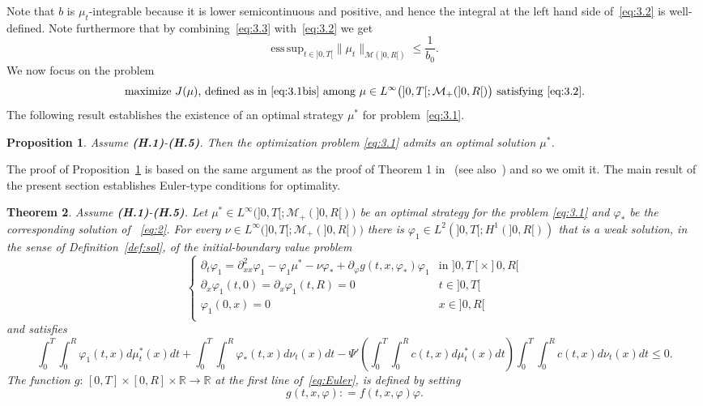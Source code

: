 \documentclass[11pt,leqno]{amsart}
\newtheorem{theorem}{Theorem}[section]
\newtheorem{proposition}[theorem]{Proposition}
\numberwithin{equation}{section}
\begin{document}
Note that $b$ is $\mu_t$-integrable because it is lower semicontinuous and positive, and hence the integral at the left hand side of~\eqref{eq:3.2} is well-defined. 
Note furthermore that by combining~\eqref{eq:3.3} with~\eqref{eq:3.2} we get 
\begin{equation}
\label{e:conscons}
    \mathrm{ess \, sup}_{t \in ]0, T[} \| \mu_t \|_{\mathcal M (]0, R[)} \leq \frac{1}{b_0}. 
\end{equation}
We now focus on the problem
\begin{equation}
  \label{eq:3.1}
  \text{maximize $J(\mu)$, defined as in~\eqref{eq:3.1bis}
    among $\mu \in L^\infty 
    \big(]0, T[; \mathcal M_+ (]0, R[) \big)$ satisfying~\eqref{eq:3.2}}.      
\end{equation}
The following result establishes the existence of an optimal strategy $\mu^\ast$
for problem~\eqref{eq:3.1}. 
\begin{proposition}
\label{th:main2} Assume \emph{{\bf (H.1)}-{\bf (H.5)}}. Then 
the optimization problem \eqref{eq:3.1} admits an optimal solution $\mu^\ast$.
\end{proposition}
The proof of Proposition~\ref{th:main2} is based on the same argument as the proof of    
Theorem 1 in~\cite{BS1} (see also~\cite[Theorem 4.1]{CG}) and so we omit it. 
The main result of the present section establishes Euler-type conditions for optimality. 
\begin{theorem}
  \label{th:Euler}
  Assume  \emph{{\bf (H.1)}-{\bf (H.5)}}. Let $\mu^*\in L^\infty\big(]0,T[;{\mathcal M}_+(]0,R[)\big)$ be an optimal strategy for the problem \eqref{eq:3.1} and ${\varphi}_\ast$ be the corresponding solution of 
~\eqref{eq:2}.  
For every $\nu\in L^\infty\big(]0,T[;{\mathcal M}_+(]0,R[)\big)$ there is 
${\varphi}_1 \in L^2 (]0, T[; H^1 (]0, R[))$ that is a weak solution, in the sense of Definition~\ref{def:sol}, 
of the initial-boundary value problem
\begin{equation}
\label{eq:Euler}
\begin{cases}
{\partial_t} {\varphi}_1={\partial_{xx}^2} {\varphi}_1-{\varphi}_1 \mu^\ast-\nu {\varphi}_\ast+ \partial_{\varphi} g (t, x, {\varphi}_*) {\varphi}_1  &
 \text{in $]0, T[ \times ]0, R[$}\\
{\partial_x } {\varphi}_1(t,0)={\partial_x } {\varphi}_1(t,R)=0 & t \in ]0, T[  \\
{\varphi}_1(0,x)=0 & x\in ]0,R[ \\
\end{cases}
\end{equation}
and satisfies 
\begin{equation}
\label{eq:Euler-int}
\int_0^T  \! \!  \int_0^R {\varphi}_1 (t,x) d\mu^*_t(x)dt+
\int_0^T  \! \! \int_0^R  {\varphi}_\ast(t,x)
d\nu_t(x)dt-\Psi'
\left(\int_0^T \! \! \int_0^R c(t,x) d\mu^*_t(x)dt\right)
\int_0^T  \! \! \int_0^Rc(t,x) d\nu_t(x)dt \le 0.
\end{equation}
The function $g: \, [0, T] \times [0, R] \times {\mathbb{R}} 
\to {\mathbb{R}}$  at the first line of~\eqref{eq:Euler}, is defined by setting 
\begin{equation}
\label{e:cosaeg}
        g (t, x, {\varphi}) : = f(t, x, {\varphi}){\varphi}. 
\end{equation}
\end{theorem}
\end{document}
